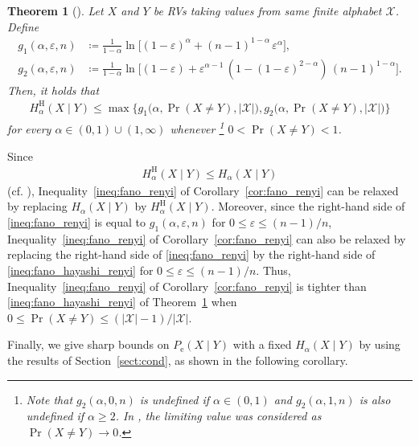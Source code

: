 \documentclass[conference, draftcls, onecolumn]{IEEEtran}
\theoremstyle{plain}
\newtheorem{theorem}{Theorem}
\newcommand{\thref}[1]{Theorem~\ref{#1}}
\newcommand{\corref}[1]{Corollary~\ref{#1}}
\newcommand{\sectref}[1]{Section~\ref{#1}}
\begin{document}
\begin{theorem}[{\cite[Theorem~7]{iwamoto}}]
\label{th:fano_hayashi_renyi}
Let $X$ and $Y$ be RVs taking values from same finite alphabet $\mathcal{X}$.
Define
\begin{align}
g_{1}(\alpha, \varepsilon, n)
& \coloneqq
\frac{ 1 }{ 1 - \alpha } \ln \Big[ (1 - \varepsilon)^{\alpha} + (n - 1)^{1-\alpha} \, \varepsilon^{\alpha} \Big] ,
\\
g_{2}(\alpha, \varepsilon, n)
& \coloneqq
\frac{ 1 }{ 1 - \alpha } \ln \Big[ (1 - \varepsilon) + \varepsilon^{\alpha-1} \, (1 - (1-\varepsilon)^{2-\alpha}) \, (n - 1)^{1-\alpha} \Big] .
\end{align}
Then, it holds that
\begin{align}
H_{\alpha}^{\mathrm{H}}(X \mid Y)
\le
\max \! \Big\{ g_{1} \big( \alpha, \Pr(X \neq Y), |\mathcal{X}| \big), g_{2} \big(\alpha, \Pr(X \neq Y), |\mathcal{X}| \big) \Big\}
\label{ineq:fano_hayashi_renyi}
\end{align}
for every $\alpha \in (0, 1) \cup (1, \infty)$ whenever%
\footnote{%
Note that $g_{2}(\alpha, 0, n)$ is undefined if $\alpha \in (0, 1)$ and $g_{2}(\alpha, 1, n)$ is also undefined if $\alpha \ge 2$.
In \cite[Theorem~7]{iwamoto}, the limiting value was considered as $\Pr(X \neq Y) \to 0$.%
}
$0 < \Pr(X \neq Y) < 1$.
\end{theorem}


Since
\begin{align}
H_{\alpha}^{\mathrm{H}}(X \mid Y)
\le
H_{\alpha}(X \mid Y)
\end{align}
(cf. \cite[Theorem~1]{iwamoto}), Inequality~\eqref{ineq:fano_renyi} of \corref{cor:fano_renyi} can be relaxed by replacing $H_{\alpha}(X \mid Y)$ by $H_{\alpha}^{\mathrm{H}}(X \mid Y)$.
Moreover, since the right-hand side of \eqref{ineq:fano_renyi} is equal to
$
g_{1}(\alpha, \varepsilon, n)
$
for $0 \le \varepsilon \le (n-1)/n$, Inequality~\eqref{ineq:fano_renyi} of \corref{cor:fano_renyi} can also be relaxed by replacing the right-hand side of \eqref{ineq:fano_renyi} by the right-hand side of \eqref{ineq:fano_hayashi_renyi} for $0 \le \varepsilon \le (n-1)/n$.
Thus, Inequality~\eqref{ineq:fano_renyi} of \corref{cor:fano_renyi} is tighter than \eqref{ineq:fano_hayashi_renyi} of \thref{th:fano_hayashi_renyi} when $0 \le \Pr(X \neq Y) \le (|\mathcal{X}|-1)/|\mathcal{X}|$.

Finally, we give sharp bounds on $P_{\mathrm{e}}(X \mid Y)$ with a fixed $H_{\alpha}(X \mid Y)$ by using the results of \sectref{sect:cond}, as shown in the following corollary.
\end{document}
